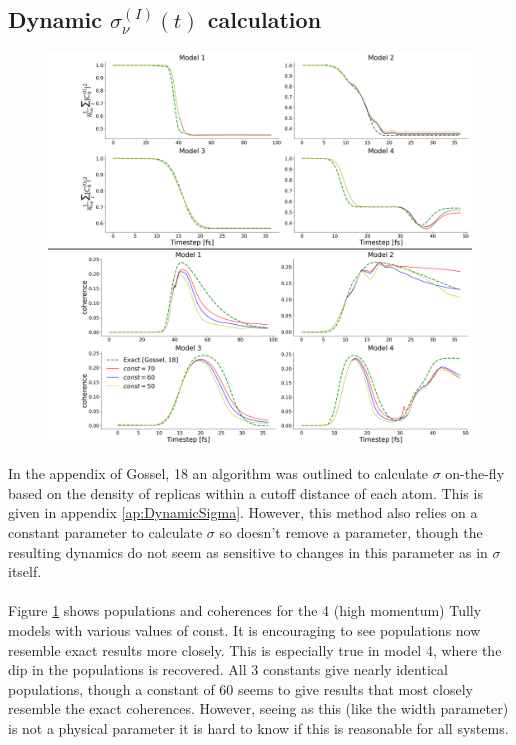 \subsection{Dynamic $\sigma^{(I)}_{\nu}(t)$ calculation}
\begin{figure}[ht]
  \includegraphics[width=\textwidth]{img/CTMQC/TullyModels/CTMQC_dynSig_highMom.png}
  \caption{\label{fig:dynamicSigma}}
\end{figure}
In the appendix of Gossel, 18 \cite{gossel_coupled-trajectory_2018} an algorithm was outlined to calculate $\sigma$ on-the-fly based on the density of replicas within a cutoff distance of each atom. This is given in appendix \ref{ap:DynamicSigma}. However, this method also relies on a constant parameter to calculate $\sigma$ so doesn't remove a parameter, though the resulting dynamics do not seem as sensitive to changes in this parameter as in $\sigma$ itself.
\\\\
Figure \ref{fig:dynamicSigma} shows populations and coherences for the 4 (high momentum) Tully models with various values of const. It is encouraging to see populations now resemble exact results more closely. This is especially true in model 4, where the dip in the populations is recovered. All 3 constants give nearly identical populations, though a constant of 60 seems to give results that most closely resemble the exact coherences. However, seeing as this (like the width parameter) is not a physical parameter it is hard to know if this is reasonable for all systems. 

